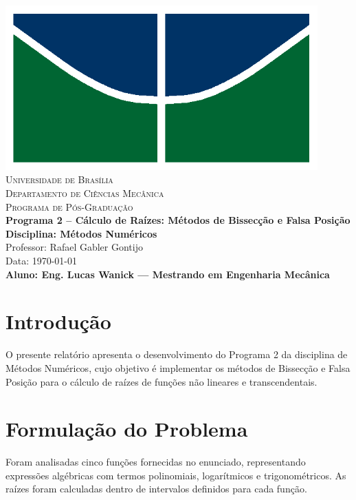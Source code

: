 \documentclass[12pt]{article}
\begin{document}
\begin{titlepage}
    \centering
    \includegraphics[width=12cm]{img/unb_bandeira.png} \\
    \vspace{1cm}
    \textsc{\Large Universidade de Bras\'ilia} \\
    \textsc{Departamento de Ciências Mec\^anica} \\
    \textsc{Programa de P\'os-Gradua\c{c}\~ao} \\
    \vfill
    {\Large\bfseries Programa 2 -- Cálculo de Raízes: Métodos de Bissecção e Falsa Posição} \\
    \vspace{0.5cm}
    \textbf{Disciplina: M\'etodos Num\'ericos} \\
    Professor: Rafael Gabler Gontijo \\
    Data: \today \\
    \vfill
    \textbf{Aluno: Eng. Lucas Wanick — Mestrando em Engenharia Mec\^anica} \\
    \vspace{0.5cm}
\end{titlepage}


\section*{Introdução}
O presente relatório apresenta o desenvolvimento do Programa 2 da disciplina de Métodos Numéricos, cujo objetivo é implementar os métodos de Bissecção e Falsa Posição para o cálculo de raízes de funções não lineares e transcendentais.

\section*{Formulação do Problema}
Foram analisadas cinco funções fornecidas no enunciado, representando expressões algébricas com termos polinomiais, logarítmicos e trigonométricos. As raízes foram calculadas dentro de intervalos definidos para cada função.
\end{document}
